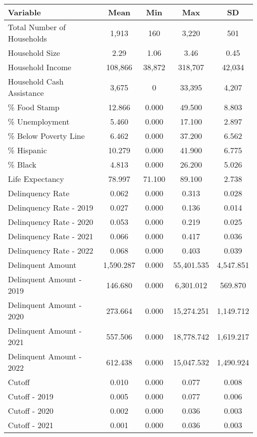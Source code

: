 \begin{tabular}{l|c|c|c|c}
\toprule 
\midrule 
Variable & Mean & Min & Max & SD \\
\midrule 
Total Number of Households & 1,913 & 160 & 3,220 & 501 \\
\quad Household Size & 2.29 & 1.06 & 3.46 & 0.45 \\
Household Income & 108,866 & 38,872 & 318,707 & 42,034 \\
\quad Household Cash Assistance & 3,675 & 0 & 33,395 & 4,207 \\
\% Food Stamp & 12.866 & 0.000 & 49.500 & 8.803 \\
\% Unemployment & 5.460 & 0.000 & 17.100 & 2.897 \\
\% Below Poverty Line & 6.462 & 0.000 & 37.200 & 6.562 \\
\% Hispanic & 10.279 & 0.000 & 41.900 & 6.775 \\
\% Black & 4.813 & 0.000 & 26.200 & 5.026 \\
Life Expectancy & 78.997 & 71.100 & 89.100 & 2.738 \\
\midrule 
Delinquency Rate & 0.062 & 0.000 & 0.313 & 0.028 \\
\quad Delinquency Rate - 2019 & 0.027 & 0.000 & 0.136 & 0.014 \\
\quad Delinquency Rate - 2020 & 0.053 & 0.000 & 0.219 & 0.025 \\
\quad Delinquency Rate - 2021 & 0.066 & 0.000 & 0.417 & 0.036 \\
\quad Delinquency Rate - 2022 & 0.068 & 0.000 & 0.403 & 0.039 \\
\midrule 
Delinquent Amount & 1,590.287 & 0.000 & 55,401.535 & 4,547.851 \\
\quad Delinquent Amount - 2019 & 146.680 & 0.000 & 6,301.012 & 569.870 \\
\quad Delinquent Amount - 2020 & 273.664 & 0.000 & 15,274.251 & 1,149.712 \\
\quad Delinquent Amount - 2021 & 557.506 & 0.000 & 18,778.742 & 1,619.217 \\
\quad Delinquent Amount - 2022 & 612.438 & 0.000 & 15,047.532 & 1,490.924 \\
\midrule 
Cutoff & 0.010 & 0.000 & 0.077 & 0.008 \\
\quad Cutoff - 2019 & 0.005 & 0.000 & 0.077 & 0.006 \\
\quad Cutoff - 2020 & 0.002 & 0.000 & 0.036 & 0.003 \\
\quad Cutoff - 2021 & 0.001 & 0.000 & 0.036 & 0.003 \\

\end{tabular}
